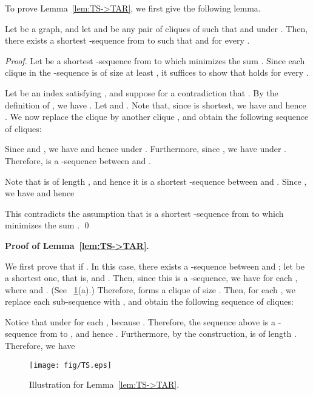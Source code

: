 \documentclass{llncs}
\newcounter{one}
\begin{document}
	To prove Lemma~\ref{lem:TS->TAR}, we first give the following lemma.	
	\begin{lemma} \label{lem:ar<=k+1}
	Let  be a graph, and let  and  be any pair of cliques of  such that  and  under .
	Then, there exists a shortest -sequence  from  to  such that  and  for every .
	\end{lemma}
	\begin{proof}
	Let  be a shortest -sequence from  to  which minimizes the sum .
Since each clique in the -sequence  is of size at least , it suffices to show that  holds for every .

	Let  be an index satisfying , and suppose for a contradiction that .
	By the definition of , we have .
	Let  and .
	Note that, since  is shortest, we have  and hence .
	We now replace the clique  by another clique , and obtain the following sequence  of cliques:
	
	Since  and , we have  and hence  under .
	Furthermore, since , we have  under . 
	Therefore,  is a -sequence between  and .

	Note that  is of length , and hence it is a shortest -sequence between  and .
	Since , we have  and hence 
	
	This contradicts the assumption that  is a shortest -sequence from  to  which minimizes the sum .
	\qed
	\end{proof}
\medskip



	\noindent
	{\bf Proof of Lemma~\ref{lem:TS->TAR}.}

We first prove that  if .
	In this case, there exists a -sequence between  and ; 
let  be a shortest one, that is,  and .
	Then, since this is a -sequence, we have  for each , where  and . 
(See \figurename~\ref{fig:TS}(a).)
	Therefore,   forms a clique of size .
	Then, for each , we replace each sub-sequence  with , and obtain the following sequence  of cliques:
	
	Notice that  under  for each , because .
	Therefore, the sequence  above is a -sequence from  to , and hence . 
	Furthermore, by the construction,  is of length .
	Therefore, we have 
	

	\begin{figure}[t]
		\centering
		\texttt{[image: fig/TS.eps]}
	\vspace{-1em}
	\caption{Illustration for Lemma~\ref{lem:TS->TAR}.}
	\vspace{-1em}
	\label{fig:TS}
	\end{figure}
\end{document}
